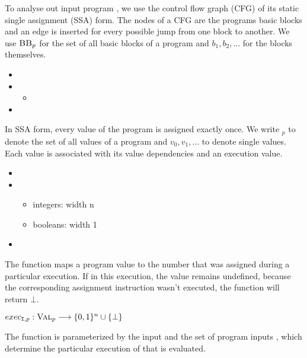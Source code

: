 
To analyse out input program \p, we use the control flow graph (CFG) of its static single assignment (SSA) form. The nodes of a CFG are the programs basic blocks  and an edge is inserted for every possible jump from one block to another. We use $\mbb_p$ for the set of all basic blocks of a program \p and $b_1, b_2, ...$ for the blocks themselves.

\begin{itemize}
    \item {}
    \item {}
    \begin{itemize}
        \item {}
    \end{itemize}
    \item {}
\end{itemize}

In SSA form, every value of the program is assigned exactly once. We write \val$_p$ to denote the set of all values of a program and $v_0, v_1, ...$ to denote single values. Each value is associated with its value dependencies and an execution value.

\begin{itemize}
    \item {}
    \item {}
    \begin{itemize}
        \item integers: width n
        \item booleans: width 1
    \end{itemize}
    \item {}
\end{itemize}

\begin{definition}
The function maps a program value to the number that was assigned during a particular execution. If in this execution, the value remains undefined, because the corresponding assignment instruction wasn't executed, the function will return $\bot$.
    \begin{center}
        $exec_{\mathtt{I}, p}: \textsc{Val}_p \longrightarrow \{0, 1\}^n \cup \{\bot\}$
    \end{center}
The function is parameterized by the input \p and the set of program inputs \I, which determine the particular execution of \p that is evaluated.
\end{definition}

